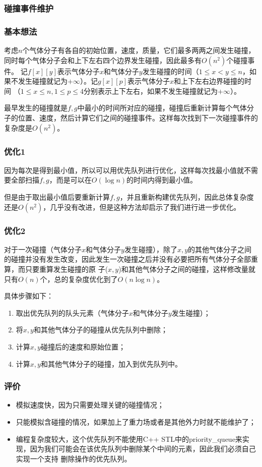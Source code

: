 ﻿\documentclass{article}
\begin{document}
	\subsubsection{碰撞事件维护}
	\subsubsection*{基本想法}
	\indent 考虑$n$个气体分子有各自的初始位置，速度，质量，它们最多两两之间发生碰撞，同时每个气体分子会和上下左右四个边界发生碰撞，因此最多有$O(n^2)$个碰撞事件。
	记$f[x][y]$表示气体分子$x$和气体分子$y$发生碰撞的时间（$1 \leq x < y \leq n$，如果不发生碰撞就记为$+\infty$）。记$g[x][p]$表示气体分子$x$和上下左右边界碰撞的时间
	（$1 \leq x \leq n, 1\leq p \leq 4$分别表示上下左右，如果不发生碰撞就记为$+\infty$）。\par
	最早发生的碰撞就是$f,g$中最小的时间所对应的碰撞，碰撞后重新计算每个气体分子的位置、速度，然后计算它们之间的碰撞事件。这样每次找到下一次碰撞事件的复杂度是$O(n^2)$。
	\subsubsection*{优化1}
	因为每次是得到最小值，所以可以用优先队列进行优化，这样每次找最小值就不需要全部扫描$f,g$，而是可以在$O(\log n)$的时间内得到最小值。\par
	但是由于取出最小值后要重新计算$f,g$，并且重新构建优先队列，因此总体复杂度还是$O(n^2)$，几乎没有改进，但是这种方法却启示了我们进行进一步优化。
	\subsubsection*{优化2}
	对于一次碰撞（气体分子$x$和气体分子$y$发生碰撞），除了$x,y$的其他气体分子之间的碰撞并没有发生改变，因此发生一次碰撞之后并没有必要把所有气体分子全部重算，而只要重算发生碰撞的原
	子($x,y$)和其他气体分子之间的碰撞，这样修改量就只有$O(n)$个，总的复杂度优化到了$O(n\log n)$。\par
	具体步骤如下：
	\begin{enumerate}
		\item 取出优先队列的队头元素（气体分子$x$和气体分子$y$发生碰撞）；
		\item 将$x,y$和其他气体分子的碰撞从优先队列中删除；
		\item 计算$x,y$碰撞后的速度和原始位置；
		\item 计算$x,y$和其他气体分子的碰撞，加入到优先队列中。
	\end{enumerate}
	\subsubsection{评价}
	\begin{itemize}
		\item 模拟速度快，因为只需要处理关键的碰撞情况；
		\item 只能模拟含碰撞的情况，如果加上了重力场或者是其他外力时就不能维护了；
		\item 编程复杂度较大，这个优先队列不能使用C++ STL中的priority\_queue来实现，因为我们可能会在该优先队列中删除某个中间的元素，因此我们必须自己实现一个支持
		删除操作的优先队列。
	\end{itemize}
\end{document}
